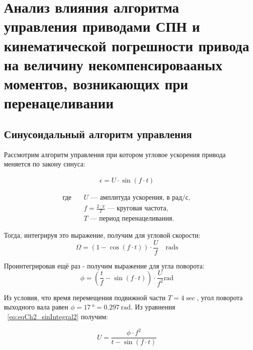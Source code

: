 \chapter{Анализ влияния алгоритма управления приводами СПН и кинематической погрешности привода на величину некомпенсировааных моментов, возникающих при перенацеливании}\label{ch:ch2}

\section{Синусоидальный алгоритм управления}\label{sec:ch2/sec1}

Рассмотрим алгоритм управления при котором угловое ускорения привода меняется по закону синуса:

\begin{samepage}
	\begin{equation}
		\label{eq:eqCh2_sin}
		\begin{aligned}
			\epsilon = U \cdot \sin(f \cdot t)
		\end{aligned}	
	\end{equation}
	
	\begin{align*}
		\text{где} \quad 
		& U \text{ — амплитуда ускорения, в } \text{рад/с}, \\           
		& f = \frac{2 \cdot \pi}{T} \text{ — круговая частота}, \\       
		& T \text{ — период перенацеливания.}
	\end{align*}
\end{samepage}
	
Тогда, интегрируя это выражение, получим для угловой скорости:
\begin{equation}
	\label{eq:eqCh2_sinIntegral}
	\Omega = \left(1 - \cos\left(f \cdot t\right)\right) \cdot \frac{U}{f} \quad \si{\radian\second}
\end{equation}

Проинтегрировав ещё раз - получим выражение для угла поворота:
\begin{equation}
	\label{eq:eqCh2_sinIntegral2}
	\phi = \left( \frac{t}{f} - \sin\left(f \cdot t\right) \right) \cdot \frac{U}{f^2} \si{\radian}
\end{equation}

Из условия, что время перемещения подвижной части $T = 4 \si{\sec}$, угол поворота выходного вала равен $\phi = \SI{17}{\degree} = \SI{0.297}{\radian}$.
Из уравнения ~\cref{eq:eqCh2_sinIntegral2} получим:

\begin{equation}
	\label{eq:eqCh2_Uacc}
	U = \frac{\phi \cdot f^2}{t - \sin(f \cdot t)}
\end{equation}

